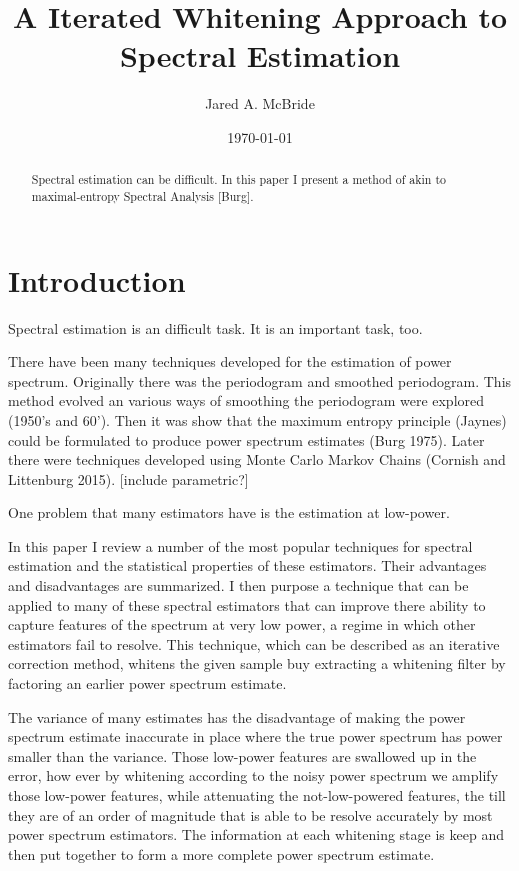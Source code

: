 \documentclass[12pt]{amsart}
\title{A Iterated Whitening Approach to Spectral Estimation}
\author{Jared A. McBride}
\date{\today}
\begin{document}
	
\begin{abstract}
Spectral estimation can be difficult. In this paper I present a method of akin to maximal-entropy Spectral Analysis [Burg]. 
\end{abstract}

\maketitle
\tableofcontents

\section{Introduction}



Spectral estimation is an difficult task. It is an important task, too. 

There have been many techniques developed for the estimation of power spectrum. Originally there was the periodogram and smoothed periodogram. This method evolved an various ways of smoothing the periodogram were explored (1950's and 60'). Then it was show that the maximum entropy principle (Jaynes) could be formulated to produce power spectrum estimates (Burg 1975). Later there were techniques developed using Monte Carlo Markov Chains (Cornish and Littenburg 2015). [include parametric?]

One problem that many estimators have is the estimation at low-power. 

In this paper I review a number of the most popular techniques for spectral estimation and the statistical properties of these estimators. Their advantages and disadvantages are summarized. I then purpose a technique that can be applied to many of these spectral estimators that can improve there ability to capture features of the spectrum at very low power, a regime in which other estimators fail to resolve. This technique, which can be described as an iterative correction method, whitens the given sample buy extracting a whitening filter by factoring an earlier power spectrum estimate.

The variance of many estimates has the disadvantage of making the power spectrum estimate inaccurate in place where the true power spectrum has power smaller than the variance. Those low-power features are swallowed up in the error, how ever by whitening according to the noisy power spectrum we amplify those low-power features, while attenuating the not-low-powered features, the  till they are of an order of magnitude that is able to be resolve accurately by most power spectrum estimators. The information at each whitening stage is keep and then put together to form a more complete power spectrum estimate.  
\end{document}
